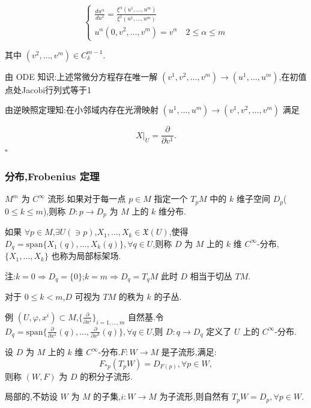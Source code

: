 \[
\begin{cases}
\frac{du^{\alpha}}{du^1} = \frac{\xi^{\alpha}(u^1, \ldots, u^m)}{\xi^1(u^1, \ldots, u^m)} \\
u^{\alpha}(0, v^2, \ldots, v^m) = v^{\alpha} \quad 2 \leq \alpha \leq m
\end{cases}
\]

其中 $(v^2, \ldots, v^m) \in C_\delta^{m-1}$.

由 ODE 知识:上述常微分方程存在唯一解 $(v^1, v^2, \ldots, v^m) \to (u^1, \ldots, u^m)$,在初值点处Jacobi行列式等于1

由逆映照定理知:在小邻域内存在光滑映射 $(u^1, \ldots, u^m) \to (v^1, v^2, \ldots, v^m)$ 满足

\[
X|_U = \frac{\partial}{\partial v^1}.
\]
$\square$

\subsubsection{分布,Frobenius 定理}

\begin{definition}
$M^m$ 为 $C^\infty$ 流形.如果对于每一点 $p \in M$ 指定一个 $T_pM$ 中的 $k$ 维子空间 $D_p$($0 \leq k \leq m$),则称 $D: p \to D_p$ 为 $M$ 上的 $k$ 维分布.
\end{definition}

如果 $\forall p \in M$,$\exists U(\ni p)$,$X_1, \ldots, X_k \in \mathfrak{X}(U)$,使得 $D_q = \text{span}\{X_1(q), \ldots, X_k(q)\}, \forall q \in U$,则称 $D$ 为 $M$ 上的 $k$ 维 $C^\infty$-分布,$\{X_1, \ldots, X_k\}$ 也称为局部标架场.

注:$k = 0 \Rightarrow D_q = \{0\}$;$k = m \Rightarrow D_q = T_qM$ 此时 $D$ 相当于切丛 $TM$.

对于 $0 \leq k < m$,$D$ 可视为 $TM$ 的秩为 $k$ 的子丛.

例 $(U, \varphi, x^i) \subset M$,$\{\frac{\partial}{\partial x^i}\}_{i=1,\ldots,m}$ 自然基.令 $D_q = \text{span}\{\frac{\partial}{\partial x^1}(q), \ldots, \frac{\partial}{\partial x^k}(q)\}, \forall q \in U$,则 $D: q \to D_q$ 定义了 $U$ 上的 $C^\infty$-分布.

\begin{definition}
设 $D$ 为 $M$ 上的 $k$ 维 $C^\infty$-分布.$F: W \to M$ 是子流形,满足:
\[
F_{*p}(T_pW) = D_{F(p)}, \forall p \in W,
\]
则称 $(W, F)$ 为 $D$ 的积分子流形.
\end{definition}

局部的,不妨设 $W$ 为 $M$ 的子集,$i: W \to M$ 为子流形,则自然有 $T_pW = D_p, \forall p \in W$.

